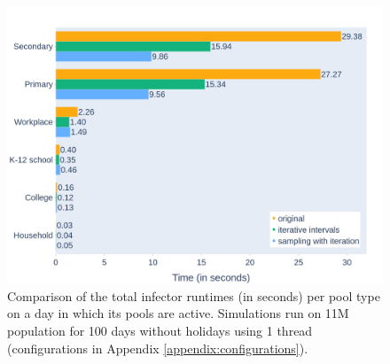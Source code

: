 \begin{figure}
    \centering
    \includegraphics[width=\linewidth]{4 - Sampling/fig/sampling_with_iteration/swi_vs_rest_type_totals.png}
    \caption{Comparison of the total infector runtimes (in seconds) per pool type on a day in which its pools are active. Simulations run on 11M population for 100 days without holidays using 1 thread (configurations in Appendix \ref{appendix:configurations}).}
    \label{fig:swi_vs_rest_type_totals}
\end{figure}

